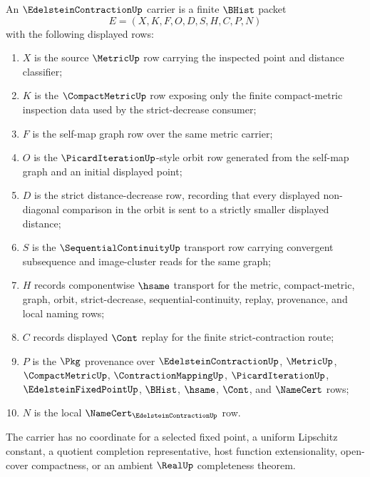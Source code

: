 \begin{definition}
\label{def:edelstein-contraction-carrier}
An $\EdelsteinContractionUp$ carrier is a finite $\BHist$ packet
$$
E=(X,K,F,O,D,S,H,C,P,N)
$$
with the following displayed rows:
\begin{enumerate}
\item $X$ is the source $\MetricUp$ row carrying the inspected point and distance classifier;
\item $K$ is the $\CompactMetricUp$ row exposing only the finite compact-metric inspection data used by the strict-decrease consumer;
\item $F$ is the self-map graph row over the same metric carrier;
\item $O$ is the $\PicardIterationUp$-style orbit row generated from the self-map graph and an initial displayed point;
\item $D$ is the strict distance-decrease row, recording that every displayed non-diagonal comparison in the orbit is sent to a strictly smaller displayed distance;
\item $S$ is the $\SequentialContinuityUp$ transport row carrying convergent subsequence and image-cluster reads for the same graph;
\item $H$ records componentwise $\hsame$ transport for the metric, compact-metric, graph, orbit, strict-decrease, sequential-continuity, replay, provenance, and local naming rows;
\item $C$ records displayed $\Cont$ replay for the finite strict-contraction route;
\item $P$ is the $\Pkg$ provenance over $\EdelsteinContractionUp$, $\MetricUp$, $\CompactMetricUp$, $\ContractionMappingUp$, $\PicardIterationUp$, $\EdelsteinFixedPointUp$, $\BHist$, $\hsame$, $\Cont$, and $\NameCert$ rows;
\item $N$ is the local $\NameCert_{\EdelsteinContractionUp}$ row.
\end{enumerate}
The carrier has no coordinate for a selected fixed point, a uniform Lipschitz constant, a quotient completion representative, host function extensionality, open-cover compactness, or an ambient $\RealUp$ completeness theorem.
\end{definition}

